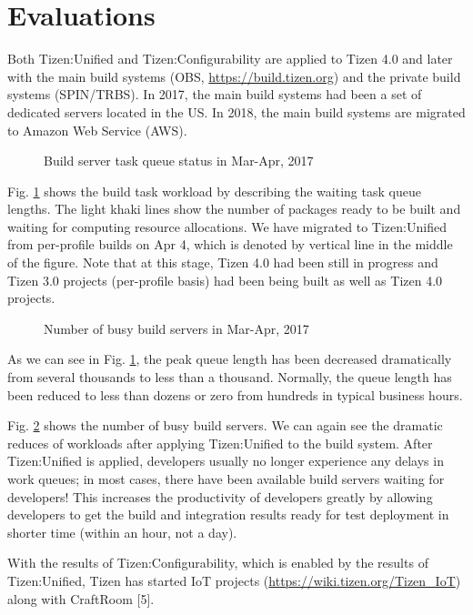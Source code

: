 \section{Evaluations}

Both Tizen:Unified and Tizen:Configurability are applied to Tizen 4.0 and later with the main build systems (OBS, \url{https://build.tizen.org}) and the private build systems (SPIN/TRBS). In 2017, the main build systems had been a set of dedicated servers located in the US. In 2018, the main build systems are migrated to Amazon Web Service (AWS).


\begin{figure}
\label{FIG_OBS_TASKQUEUE}
\caption{Build server task queue status in Mar-Apr, 2017}
\end{figure}

Fig. \ref{FIG_OBS_TASKQUEUE} shows the build task workload by describing the waiting task queue lengths. The light khaki lines show the number of packages ready to be built and waiting for computing resource allocations. We have migrated to Tizen:Unified from per-profile builds on Apr 4, which is denoted by vertical line in the middle of the figure. Note that at this stage, Tizen 4.0 had been still in progress and Tizen 3.0 projects (per-profile basis) had been being built as well as Tizen 4.0 projects.


\begin{figure}
\label{FIG_OBS_MUNIN}
\caption{Number of busy build servers in Mar-Apr, 2017}
\end{figure}

As we can see in Fig. \ref{FIG_OBS_TASKQUEUE}, the peak queue length has been decreased dramatically from several thousands to less than a thousand. Normally, the queue length has been reduced to less than dozens or zero from hundreds in typical business hours.


Fig. \ref{FIG_OBS_MUNIN} shows the number of busy build servers. We can again see the dramatic reduces of workloads after applying Tizen:Unified to the build system. After Tizen:Unified is applied, developers usually no longer experience any delays in work queues; in most cases, there have been available build servers waiting for developers! This increases the productivity of developers greatly by allowing developers to get the build and integration results ready for test deployment in shorter time (within an hour, not a day).


With the results of Tizen:Configurability, which is enabled by the results of Tizen:Unified, Tizen has started IoT projects (\url{https://wiki.tizen.org/Tizen_IoT}) along with CraftRoom [5].


